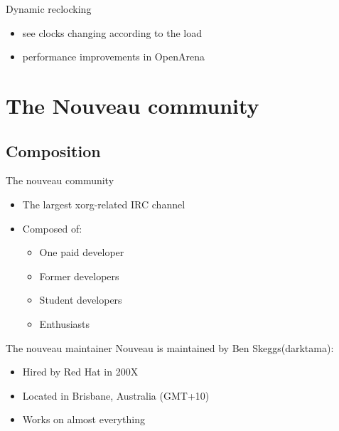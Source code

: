 \documentclass[11pt,english,compress]{beamer}
\begin{document}
	\begin{frame}
		\begin{block}{Dynamic reclocking}
			\begin{itemize}
				\item see clocks changing according to the load
				\item performance improvements in OpenArena
			\end{itemize}
		\end{block}
	\end{frame}

\section{The Nouveau community}
	\subsection{Composition}
		\begin{frame}
			\begin{block}{The nouveau community}
				\begin{itemize}
					\item The largest xorg-related IRC channel
					\item Composed of:
						\begin{itemize}
							\item One paid developer
							\item Former developers
							\item Student developers
							\item Enthusiasts
						\end{itemize}
				\end{itemize}
			\end{block}

			\begin{block}{The nouveau maintainer}
				Nouveau is maintained by Ben Skeggs(darktama):
				\begin{itemize}
					\item Hired by Red Hat in 200X
					\item Located in Brisbane, Australia (GMT+10)
					\item Works on almost everything
				\end{itemize}
			\end{block}
		\end{frame}
\end{document}
